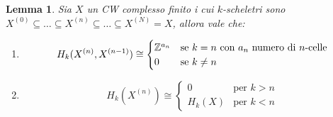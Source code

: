 \documentclass[10pt, twoside=false, x11names]{scrbook}
\newtheorem{lemma}[theorem]{Lemma}
\newcommand{\Z}{\mathbb{Z}}
\begin{document}
\begin{lemma}
  Sia $ X $ un CW complesso finito i cui $ k $-scheletri sono $ X^{(0)} \subseteq  \dots \subseteq X^{(n)} \subseteq \dots \subseteq X^{(N)} = X $,
  allora vale che:
  \begin{enumerate}
  \item
    \[
      H_k(X^{(n)}, X^{(n-1)}) \cong
      \begin{cases}
        \Z^{a_n} & \text{se } k = n \text{ con $ a_n $ numero di $ n $-celle} \\
        0 & \text{se } k \not = n
      \end{cases}
    \]
  \item
    \[
      H_k(X^{(n)}) \cong
      \begin{cases}
        0 & \text{per } k > n \\
        H_k(X) & \text{per } k < n
      \end{cases}
    \]
  \end{enumerate}
\end{lemma}
\end{document}
